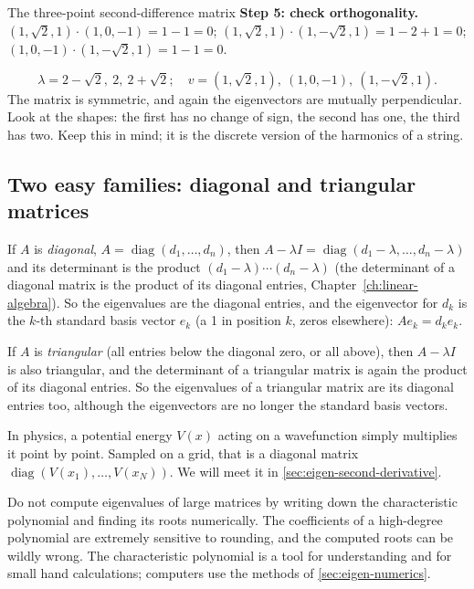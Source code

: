 \begin{sample}{The three-point second-difference matrix}
\textbf{Step 5: check orthogonality.} $(1,\sqrt2,1)\cdot(1,0,-1)=1-1=0$; $(1,\sqrt2,1)\cdot(1,-\sqrt2,1)=1-2+1=0$; $(1,0,-1)\cdot(1,-\sqrt2,1)=1-1=0$.

\[
\boxed{\lambda=2-\sqrt2,\ 2,\ 2+\sqrt2;\quad v=(1,\sqrt2,1),\ (1,0,-1),\ (1,-\sqrt2,1).}
\]
The matrix is symmetric, and again the eigenvectors are mutually perpendicular. Look at the shapes: the first has no change of sign, the second has one, the third has two. Keep this in mind; it is the discrete version of the harmonics of a string.
\end{sample}

\subsection{Two easy families: diagonal and triangular matrices}

If $A$ is \emph{diagonal}, $A=\operatorname{diag}(d_1,\dots,d_n)$, then $A-\lambda I=\operatorname{diag}(d_1-\lambda,\dots,d_n-\lambda)$ and its determinant is the product $(d_1-\lambda)\cdots(d_n-\lambda)$ (the determinant of a diagonal matrix is the product of its diagonal entries, Chapter~\ref{ch:linear-algebra}). So the eigenvalues are the diagonal entries, and the eigenvector for $d_k$ is the $k$-th standard basis vector $e_k$ (a 1 in position $k$, zeros elsewhere): $Ae_k=d_ke_k$.

If $A$ is \emph{triangular} (all entries below the diagonal zero, or all above), then $A-\lambda I$ is also triangular, and the determinant of a triangular matrix is again the product of its diagonal entries. So the eigenvalues of a triangular matrix are its diagonal entries too, although the eigenvectors are no longer the standard basis vectors.

In physics, a potential energy $V(x)$ acting on a wavefunction simply multiplies it point by point. Sampled on a grid, that is a diagonal matrix $\operatorname{diag}(V(x_1),\dots,V(x_N))$. We will meet it in \cref{sec:eigen-second-derivative}.

\begin{pitfall}
Do not compute eigenvalues of large matrices by writing down the characteristic polynomial and finding its roots numerically. The coefficients of a high-degree polynomial are extremely sensitive to rounding, and the computed roots can be wildly wrong. The characteristic polynomial is a tool for understanding and for small hand calculations; computers use the methods of \cref{sec:eigen-numerics}.
\end{pitfall}

